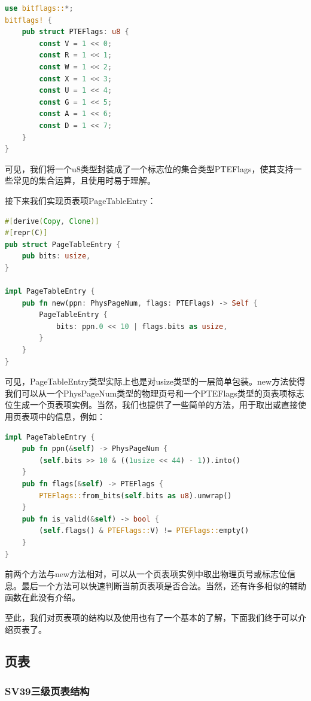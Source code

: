 \begin{lstlisting}[language={Rust}, label={code:pte},
	caption={os/src/mm/page\_table.rs}]
use bitflags::*;
bitflags! {
	pub struct PTEFlags: u8 {
		const V = 1 << 0;
		const R = 1 << 1;
		const W = 1 << 2;
		const X = 1 << 3;
		const U = 1 << 4;
		const G = 1 << 5;
		const A = 1 << 6;
		const D = 1 << 7;
	}
}
\end{lstlisting}

可见，我们将一个u8类型封装成了一个标志位的集合类型PTEFlags，使其支持一些常见的集合运算，且使用时易于理解。

接下来我们实现页表项PageTableEntry：

\begin{lstlisting}[language={Rust}, label={code:pte},
	caption={os/src/mm/page\_table.rs}]
#[derive(Copy, Clone)]
#[repr(C)]
pub struct PageTableEntry {
	pub bits: usize,
}

impl PageTableEntry {
	pub fn new(ppn: PhysPageNum, flags: PTEFlags) -> Self {
		PageTableEntry {
			bits: ppn.0 << 10 | flags.bits as usize,
		}
	}
}
\end{lstlisting}

可见，PageTableEntry类型实际上也是对usize类型的一层简单包装。new方法使得我们可以从一个PhysPageNum类型的物理页号和一个PTEFlags类型的页表项标志位生成一个页表项实例。当然，我们也提供了一些简单的方法，用于取出或直接使用页表项中的信息，例如：

\begin{lstlisting}[language={Rust}, label={code:pte},
	caption={os/src/mm/page\_table.rs}]
impl PageTableEntry {
	pub fn ppn(&self) -> PhysPageNum {
		(self.bits >> 10 & ((1usize << 44) - 1)).into()
	}
	pub fn flags(&self) -> PTEFlags {
		PTEFlags::from_bits(self.bits as u8).unwrap()
	}
	pub fn is_valid(&self) -> bool {
		(self.flags() & PTEFlags::V) != PTEFlags::empty()
	}
}
\end{lstlisting}

前两个方法与new方法相对，可以从一个页表项实例中取出物理页号或标志位信息。最后一个方法可以快速判断当前页表项是否合法。当然，还有许多相似的辅助函数在此没有介绍。

至此，我们对页表项的结构以及使用也有了一个基本的了解，下面我们终于可以介绍页表了。

\subsection{页表}

\subsubsection{SV39三级页表结构}

